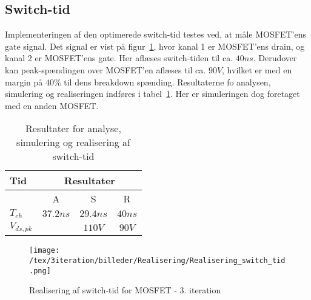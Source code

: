 

\subsection{Switch-tid}
Implementeringen af den optimerede switch-tid testes ved, at måle MOSFET'ens gate signal. Det signal er vist på figur~\ref{fig:realisering_switch_tid_3}, hvor kanal 1 er MOSFET'ens drain, og kanal 2 er MOSFET'ens gate. Her aflæses switch-tiden til ca. $40ns$. Derudover kan peak-spændingen over MOSFET'en aflæses til ca. $90V$, hvilket er med en margin på $40\percent$ til dens breakdown spænding. Resultaterne fo analysen, simulering og realiseringen indføres i tabel~\ref{tab:resultat_switch_tid_3}. Her er simuleringen dog foretaget med en anden MOSFET.

\begin{table}[H] 			
	\centering
	\begin{tabularx}{\textwidth}{|X|c|c|c|}
		\hline
		\textbf{Tid} & \multicolumn{3}{|c|}{\textbf{Resultater}} 										\\ \hline
		& A & S & R 									\\ \hline
		$T_{ch}$    & $37.2ns$ & $29.4ns$ & $40ns$ 											\\ \hline 
		$V_{ds,pk}$ &          & $110V$   & $90V$		\\ \hline 
		
	\end{tabularx}
	\caption{Resultater for analyse, simulering og realisering af switch-tid}
	\label{tab:resultat_switch_tid_3}
\end{table}

\begin{figure}[H]
	\center
	\texttt{[image: /tex/3iteration/billeder/Realisering/Realisering\_switch\_tid.png]}
	\caption{Realisering af switch-tid for MOSFET - 3. iteration}
	\label{fig:realisering_switch_tid_3}
\end{figure}